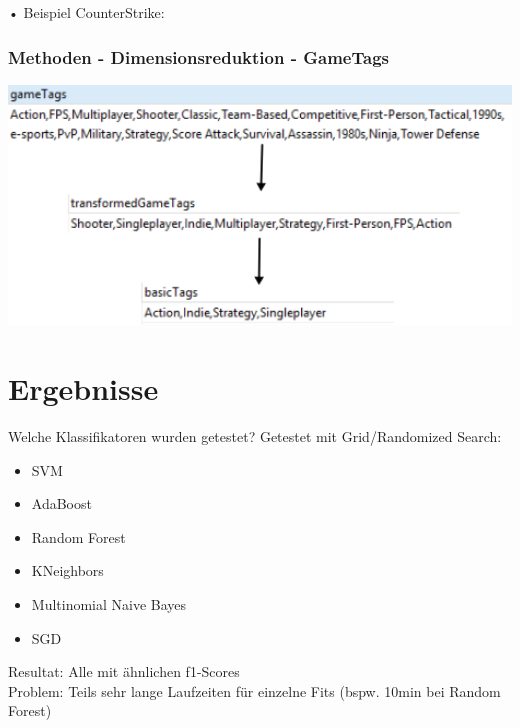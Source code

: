 \documentclass[12pt]{beamer}
\begin{document}
\begin{frame}{•}
	Beispiel CounterStrike: \newline \newblock
	\frametitle{Methoden - Dimensionsreduktion - GameTags}
	\includegraphics[width=1\textwidth]{img/cs_gametag_reduction.png}
\end{frame}	


\section{Ergebnisse}
\begin{frame}[fragile]{Welche Klassifikatoren wurden getestet?}
	Getestet mit Grid/Randomized Search:
	\begin{itemize}
		\item SVM 
		\item AdaBoost
		\item Random Forest
		\item KNeighbors
		\item Multinomial Naive Bayes
		\item SGD
	\end{itemize}

	Resultat: Alle mit ähnlichen f1-Scores \\
	Problem: Teils sehr lange Laufzeiten für einzelne Fits (bspw. 10min bei Random Forest)
\end{frame}
\end{document}
